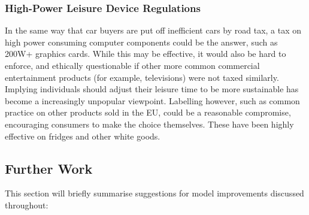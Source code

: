 \documentclass[conference]{IEEEtran}
\begin{document}
\subsubsection{High-Power Leisure Device Regulations}

In the same way that car buyers are put off inefficient cars by road
tax, a tax on high power consuming computer components could be the
answer, such as 200W+ graphics cards. While this may be effective, it
would also be hard to enforce, and ethically questionable if other
more common commercial entertainment products (for example,
televisions) were not taxed similarly. Implying individuals should
adjust their leisure time to be more sustainable has become a
increasingly unpopular viewpoint. Labelling however, such as common
practice on other products sold in the EU, could be a reasonable
compromise, encouraging consumers to make the choice themselves. These
have been highly effective on fridges and other white goods.


\subsection{Further Work}

This section will briefly summarise suggestions for model improvements
discussed throughout:
\end{document}
